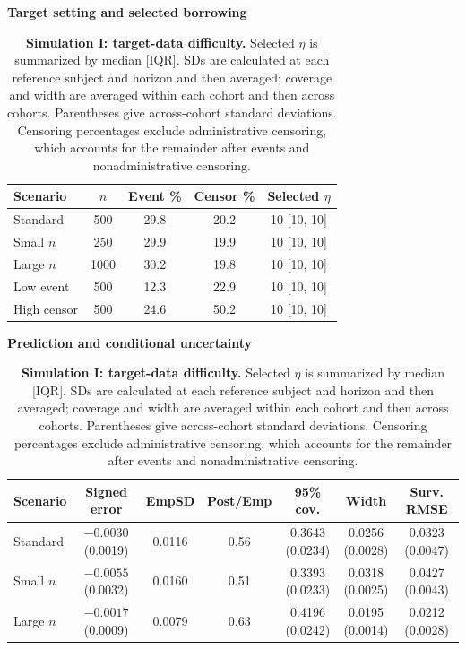 \documentclass{article} %
\begin{document}
\begin{table}[!htbp]
\centering
\caption{\textbf{Simulation I: target-data difficulty.} Selected $\eta$ is summarized by median [IQR]. SDs are calculated at each reference subject and horizon and then averaged; coverage and width are averaged within each cohort and then across cohorts. Parentheses give across-cohort standard deviations. Censoring percentages exclude administrative censoring, which accounts for the remainder after events and nonadministrative censoring.}
\label{tab:sim1_difficulty}\label{tab:sim1_difficulty_full}
\footnotesize
\setlength{\tabcolsep}{3pt}
\textbf{Target setting and selected borrowing}\par\smallskip
\begin{tabular}{@{}lcccc@{}}
\toprule
Scenario & $n$ & Event \% & Censor \% & Selected $\eta$ \\
\midrule
Standard & 500 & 29.8 & 20.2 & 10 [10, 10] \\
Small $n$ & 250 & 29.9 & 19.9 & 10 [10, 10] \\
Large $n$ & 1000 & 30.2 & 19.8 & 10 [10, 10] \\
Low event & 500 & 12.3 & 22.9 & 10 [10, 10] \\
High censor & 500 & 24.6 & 50.2 & 10 [10, 10] \\
\bottomrule
\end{tabular}
\par\medskip
\textbf{Prediction and conditional uncertainty}\par\smallskip
\begin{tabular}{@{}lcccccc@{}}
\toprule
Scenario & Signed error & EmpSD & Post/Emp & 95\% cov. & Width & Surv. RMSE \\
\midrule
Standard & \shortstack{$-0.0030$\\(0.0019)} & 0.0116 & 0.56 & \shortstack{0.3643\\(0.0234)} & \shortstack{0.0256\\(0.0028)} & \shortstack{0.0323\\(0.0047)} \\
Small $n$ & \shortstack{$-0.0055$\\(0.0032)} & 0.0160 & 0.51 & \shortstack{0.3393\\(0.0233)} & \shortstack{0.0318\\(0.0025)} & \shortstack{0.0427\\(0.0043)} \\
Large $n$ & \shortstack{$-0.0017$\\(0.0009)} & 0.0079 & 0.63 & \shortstack{0.4196\\(0.0242)} & \shortstack{0.0195\\(0.0014)} & \shortstack{0.0212\\(0.0028)} \\

\end{tabular}
\end{table}
\end{document}
